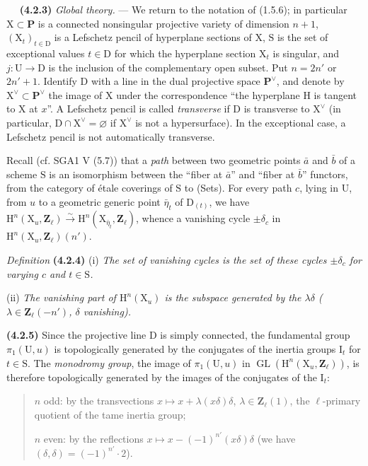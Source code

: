 \documentclass[11pt,leqno]{article}
\newcommand{\Page}[1]{\ifvmode\noindent\else\unskip\ \fi{\footnotesize\textcolor{gray}{[p.\,#1]}}\ \ignorespaces}
\begin{document}
\Page{220}
\textbf{(4.2.3)} \textit{Global theory.} — We return to the notation of (1.5.6); in particular \(\mathrm{X}\subset\mathbf{P}\) is a connected nonsingular projective variety of dimension \(n+1\), \((\mathrm{X}_t)_{t\in\mathrm{D}}\) is a Lefschetz pencil of hyperplane sections of \(\mathrm{X}\), \(\mathrm{S}\) is the set of exceptional values \(t\in\mathrm{D}\) for which the hyperplane section \(\mathrm{X}_t\) is singular, and \(j:\mathrm{U}\to\mathrm{D}\) is the inclusion of the complementary open subset. Put \(n=2n'\) or \(2n'+1\). Identify \(\mathrm{D}\) with a line in the dual projective space \(\mathbf{P}^{\vee}\), and denote by \(\mathrm{X}^{\vee}\subset\mathbf{P}^{\vee}\) the image of \(\mathrm{X}\) under the correspondence “the hyperplane \(\mathrm{H}\) is tangent to \(\mathrm{X}\) at \(x\)”. A Lefschetz pencil is called \textit{transverse} if \(\mathrm{D}\) is transverse to \(\mathrm{X}^{\vee}\) (in particular, \(\mathrm{D}\cap\mathrm{X}^{\vee}=\varnothing\) if \(\mathrm{X}^{\vee}\) is not a hypersurface). In the exceptional case, a Lefschetz pencil is not automatically transverse.

Recall (cf. SGA1 V (5.7)) that a \textit{path} between two geometric points \(\bar a\) and \(\bar b\) of a scheme \(\mathrm{S}\) is an isomorphism between the “fiber at \(\bar a\)” and “fiber at \(\bar b\)” functors, from the category of étale coverings of \(\mathrm{S}\) to (Sets). For every path \(c\), lying in \(\mathrm{U}\), from \(u\) to a geometric generic point \(\bar\eta_t\) of \(\mathrm{D}_{(t)}\), we have \(\mathrm{H}^n(\mathrm{X}_u,\mathbf{Z}_\ell)\xrightarrow{\sim}\mathrm{H}^n(\mathrm{X}_{\bar\eta_t},\mathbf{Z}_\ell)\), whence a vanishing cycle \(\pm\delta_c\) in  \(\mathrm{H}^n(\mathrm{X}_u,\mathbf{Z}_\ell)(n')\).

\textit{Definition} \textbf{(4.2.4)} (i) \textit{The set of \textup{vanishing cycles} is the set of these cycles \(\pm\delta_c\) for varying \(c\) and \(t\in\mathrm{S}\).}

(ii) \textit{The \textup{vanishing part} of \(\mathrm{H}^n(\mathrm{X}_u)\) is the subspace generated by the \(\lambda\delta\) (\(\lambda\in\mathbf{Z}_\ell(-n')\), \(\delta\) vanishing).}

\textbf{(4.2.5)} Since the projective line \(\mathrm{D}\) is simply connected, the fundamental group \(\pi_1(\mathrm{U},u)\) is topologically generated by the conjugates of the inertia groups \(\mathrm{I}_t\) for \(t\in\mathrm{S}\). The \textit{monodromy group}, the image of \(\pi_1(\mathrm{U},u)\) in \(\operatorname{GL}(\mathrm{H}^n(\mathrm{X}_u,\mathbf{Z}_\ell))\), is therefore topologically generated by the images of the conjugates of the \(\mathrm{I}_t\):
\begin{quote}
\(n\) odd: by the transvections \(x\mapsto x+\lambda(x\delta)\delta\), \(\lambda\in\mathbf{Z}_\ell(1)\), the \(\ell\)-primary quotient of the tame inertia group;

\(n\) even: by the reflections \(x\mapsto x-(-1)^{n'}(x\delta)\delta\) (we have \((\delta,\delta)=(-1)^{n'}\cdot2\)).
\end{quote}
\end{document}
